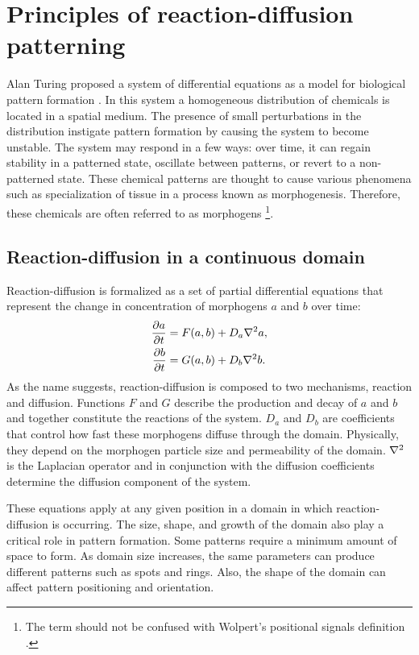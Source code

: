 \chapter{Principles of reaction-diffusion patterning} 
Alan Turing proposed a system of differential equations as a model for biological pattern formation \cite{Turing1952}. In this system a homogeneous distribution of chemicals is located in a spatial medium. The presence of small perturbations in the distribution instigate pattern formation by causing the system to become unstable. The system may respond in a few ways: over time, it can regain stability in a patterned state, oscillate between patterns, or revert to a non-patterned state. These chemical patterns are thought to cause various phenomena such as specialization of tissue in a process known as morphogenesis. Therefore, these chemicals are often referred to as morphogens \footnote{The term  should not be confused with Wolpert’s positional signals definition \cite{WolpertLewis1996}.}.

\section{Reaction-diffusion in a continuous domain}
Reaction-diffusion is formalized as a set of partial differential equations that represent the change in concentration of morphogens $a$ and $b$ over time:
	\begin{equation}
	\begin{aligned} \label{eq:basicRD}
		\frac{\partial a}{\partial t} &= F(a, b) + D_a \nabla^2 a,\\
		\frac{\partial b}{\partial t} &= G(a, b) + D_b \nabla^2 b.
	\end{aligned}
	\end{equation}
As the name suggests, reaction-diffusion is composed to two mechanisms, reaction and diffusion. Functions $F$ and $G$ describe the production and decay of $a$ and $b$ and together constitute the reactions of the system. $D_a$ and $D_b$ are coefficients that control how fast these morphogens diffuse through the domain. Physically, they depend on the morphogen particle size and permeability of the domain. $\nabla^2{}$ is the Laplacian operator and in conjunction with the diffusion coefficients determine the diffusion component of the system.

These equations apply at any given position in a domain in which reaction-diffusion is occurring. The size, shape, and growth of the domain also play a critical role in pattern formation. Some patterns require a minimum amount of space to form. As domain size increases, the same parameters can produce different patterns such as spots and rings. Also, the shape of the domain can affect pattern positioning and orientation.

